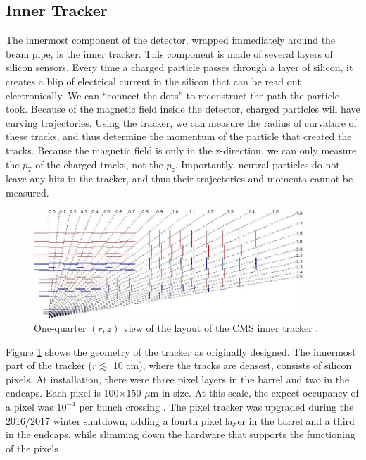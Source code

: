 \subsection{Inner Tracker}
\label{ssec:cms:components:tracker}

The innermost component of the detector, wrapped immediately around
the beam pipe, is the inner tracker. This component is made of several
layers of silicon sensors. Every time a charged
particle passes through a layer of silicon, it creates a blip of
electrical current in the silicon that can be read out
electronically. We can ``connect the dots'' to reconstruct the path
the particle took. Because of the magnetic field inside the detector,
charged particles will have curving trajectories. Using the tracker,
we can measure the radius of curvature of these tracks, and thus
determine the momentum of the particle that created the
tracks. Because the magnetic field is only in the z-direction, we can
only measure the $p_T$ of the charged tracks, not the
$p_z$. Importantly, neutral particles do not leave any hits in the
tracker, and thus their trajectories and momenta cannot be measured.

\begin{figure}[htb]
\centering
\includegraphics[width=0.9\textwidth]{figures/tracker.jpg}
\caption[One-quarter $(r,z)$ view of the layout of the CMS inner
tracker.]{One-quarter $(r,z)$ view of the layout of the CMS inner tracker \cite{tdr}.}
\label{fig:cms:tracker}
\end{figure}

Figure \ref{fig:cms:tracker} shows the geometry of the tracker as originally designed.
The innermost part of the tracker ($r \lesssim$ 10 cm), where the tracks are densest,
consists of silicon pixels. At installation, there were three pixel
layers in the barrel and two in the endcaps. Each pixel is
100$\times$150 $\mu$m in size. At this scale, the expect occupancy of
a pixel was $10^{-4}$ per bunch crossing \cite{tdr}. The pixel tracker
was upgraded during the 2016/2017 winter shutdown, adding a fourth
pixel layer in the barrel and a third in the endcaps, while slimming
down the hardware that supports the functioning of the pixels
\cite{pixeltdr}.

